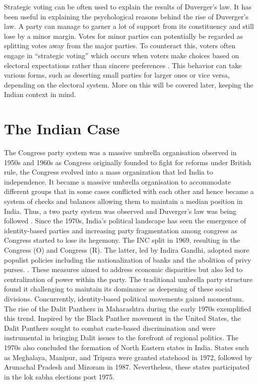 \vspace{0.3cm}

Strategic voting can be often used to explain the results of Duverger's law. It has been useful in explaining the psychological reasons behind the rise of Duverger's law. A party can manage to garner a lot of support from its constituency and still lose by a minor margin. Votes for minor parties can potentially be regarded as splitting votes away from the major parties. To counteract this, voters often engage in \enquote{strategic voting}  which occurs when voters make choices based on electoral expectations rather than sincere preferences \citep{Bol2019StrategicVV}. This behavior can take various forms, such as deserting small parties for larger ones or vice versa, depending on the electoral system. More on this will be covered later, keeping the Indian context in mind. 
 
\section{The Indian Case}
The Congress party system \citep{kothari1967india, candland1997congress} was a massive umbrella organisation observed in 1950s and 1960s as Congress originally founded to fight for reforms under British rule, the Congress evolved into a mass organization that led India to independence. It became a massive umbrella organisation to accommodate different groups that in some cases conflicted with each other and hence became a system of checks and balances allowing them to maintain a median position in India. Thus, a two party system was observed and Duverger's law was being followed \citep{riker1982two}. Since the 1970s, India's political landscape has seen the emergence of identity-based parties and increasing party fragmentation among congress as Congress started to lose its hegemony. The INC  split in 1969, resulting in the Congress (O) and Congress (R). The latter, led by Indira Gandhi, adopted more populist policies including the nationalization of banks and the abolition of privy purses. \citep{Guha2011article}. These measures aimed to address economic disparities but also led to centralization of power within the party. The traditional umbrella party structure found it challenging to maintain its dominance as deepening of these social divisions. Concurrently, identity-based political movements gained momentum\citep{farooqui2016can}. The rise of the Dalit Panthers in Maharashtra during the early 1970s exemplified this trend. Inspired by the Black Panther movement in the United States, the Dalit Panthers sought to combat caste-based discrimination and were instrumental in bringing Dalit issues to the forefront of regional politics. The 1970s also concluded the formation of North Eastern states in India. States such as Meghalaya, Manipur, and Tripura were granted statehood in 1972, followed by Arunachal Pradesh and Mizoram in 1987.  Nevertheless, these states participated in the lok sabha elections post 1975.

